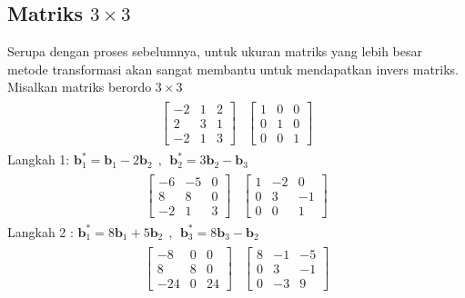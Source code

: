 \subsection{Matriks $3\times 3$}
Serupa dengan proses sebelumnya, untuk ukuran matriks yang lebih besar metode transformasi akan sangat membantu untuk mendapatkan invers matriks. Misalkan matriks berordo $3\times3$
\begin{align*}
	\begin{array}{r|r} 
		\left[
	\begin{array}{rrr} 
		-2 & 1 & 2\\
		2 & 3 & 1\\
		-2 &1 & 3 
	\end{array} 
	\right]  & \left[
	\begin{array}{rrr} 
		1 & 0 & 0\\
		0 & 1 & 0\\
		0 &0 & 1 
	\end{array} 
	\right]
	\end{array}
\end{align*}
Langkah 1: $\textbf{b}^*_1= \textbf{b}_1 - 2\textbf{b}_2~~,~~\textbf{b}^*_2= 3\textbf{b}_2 - \textbf{b}_3$ \\
\begin{align*}
	\begin{array}{r|r} 
		\left[
		\begin{array}{rrr} 
			-6 & -5 & 0\\
			8 & 8 & 0\\
			-2 &1 & 3 
		\end{array} 
		\right]  & \left[
		\begin{array}{rrr} 
			1 & -2 & 0\\
			0 & 3 & -1\\
			0 &0 & 1 
		\end{array} 
		\right]
	\end{array}
\end{align*}
Langkah 2 : $\textbf{b}^*_1= 8\textbf{b}_1 + 5\textbf{b}_2~~,~~\textbf{b}^*_3= 8\textbf{b}_3 - \textbf{b}_2$ \\
\begin{align*}
	\begin{array}{r|r} 
		\left[
		\begin{array}{rrr} 
			-8 & 0 & 0\\
			8 & 8 & 0\\
			-24 &0 & 24 
		\end{array} 
		\right]  & \left[
		\begin{array}{rrr} 
			8 & -1 & -5\\
			0 & 3 & -1\\
			0 &-3 & 9 
		\end{array} 
		\right]
	\end{array}
\end{align*}
